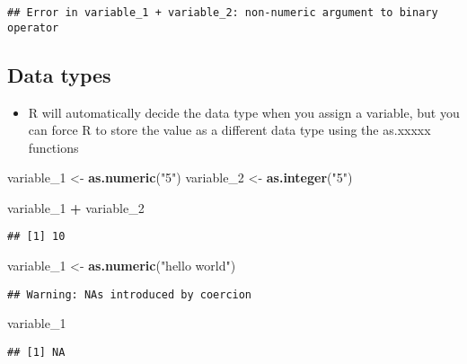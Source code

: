 \documentclass[]{article}
\newenvironment{Shaded}{\begin{snugshade}}{\end{snugshade}}
\newcommand{\KeywordTok}[1]{\textcolor[rgb]{0.13,0.29,0.53}{\textbf{#1}}}
\newcommand{\DecValTok}[1]{\textcolor[rgb]{0.00,0.00,0.81}{#1}}
\newcommand{\StringTok}[1]{\textcolor[rgb]{0.31,0.60,0.02}{#1}}
\newcommand{\OperatorTok}[1]{\textcolor[rgb]{0.81,0.36,0.00}{\textbf{#1}}}
\newcommand{\NormalTok}[1]{#1}
\providecommand{\tightlist}{%
  \setlength{\itemsep}{0pt}\setlength{\parskip}{0pt}}
\begin{document}
\begin{verbatim}
## Error in variable_1 + variable_2: non-numeric argument to binary operator
\end{verbatim}

\subsection{Data types}\label{data-types-2}

\begin{itemize}
\tightlist
\item
  R will automatically decide the data type when you assign a variable,
  but you can force R to store the value as a different data type using
  the as.xxxxx functions
\end{itemize}

\begin{Shaded}
\begin{Highlighting}[]
\NormalTok{variable_}\DecValTok{1}\NormalTok{ <-}\StringTok{ }\KeywordTok{as.numeric}\NormalTok{(}\StringTok{"5"}\NormalTok{)}
\NormalTok{variable_}\DecValTok{2}\NormalTok{ <-}\StringTok{ }\KeywordTok{as.integer}\NormalTok{(}\StringTok{"5"}\NormalTok{)}

\NormalTok{variable_}\DecValTok{1} \OperatorTok{+}\StringTok{ }\NormalTok{variable_}\DecValTok{2}
\end{Highlighting}
\end{Shaded}

\begin{verbatim}
## [1] 10
\end{verbatim}

\begin{Shaded}
\begin{Highlighting}[]
\NormalTok{variable_}\DecValTok{1}\NormalTok{ <-}\StringTok{ }\KeywordTok{as.numeric}\NormalTok{(}\StringTok{"hello world"}\NormalTok{)}
\end{Highlighting}
\end{Shaded}

\begin{verbatim}
## Warning: NAs introduced by coercion
\end{verbatim}

\begin{Shaded}
\begin{Highlighting}[]
\NormalTok{variable_}\DecValTok{1}
\end{Highlighting}
\end{Shaded}

\begin{verbatim}
## [1] NA
\end{verbatim}
\end{document}
